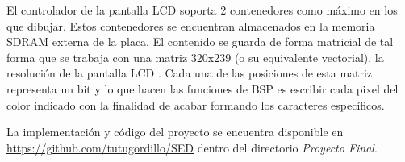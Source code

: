 El controlador de la pantalla LCD soporta 2 contenedores como m\'aximo
en los que dibujar. Estos contenedores se encuentran almacenados en la
memoria SDRAM externa de la placa. El contenido se guarda de forma
matricial de tal forma que se trabaja con una matriz 320x239 (o su
equivalente vectorial), la
resoluci\'on de la pantalla LCD . Cada una de las posiciones de esta
matriz representa un bit y lo que hacen las funciones de BSP es
escribir cada pixel del color indicado con la finalidad de acabar
formando los caracteres espec\'ificos.

La implementaci\'on y c\'odigo del proyecto se encuentra disponible en
\url{https://github.com/tutugordillo/SED} dentro del directorio
\emph{Proyecto Final}.  
